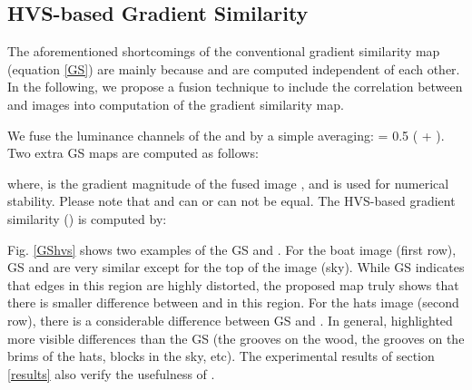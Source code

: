 \subsection{HVS-based Gradient Similarity} 

The aforementioned shortcomings of the conventional gradient similarity map (equation \ref{GS}) are mainly because  and  are computed independent of each other. In the following, we propose a fusion technique to include the correlation between  and  images into computation of the gradient similarity map.   

We fuse the luminance  channels of the  and  by a simple averaging:  = 0.5  ( + ). Two extra GS maps are computed as follows: 
                    
                    
where,  is the gradient magnitude of the fused image , and  is used for numerical stability. Please note that  and  can or can not be equal. The HVS-based gradient similarity () is computed by:
     

Fig. \ref{GShvs} shows two examples of the GS and . For the boat image (first row), GS and  are very similar except for the top of the image (sky). While GS indicates that edges in this region are highly distorted, the proposed map  truly shows that there is smaller difference between  and  in this region. For the hats image (second row), there is a considerable difference between GS and . In general,  highlighted more visible differences than the GS (the grooves on the wood, the grooves on the brims of the hats, blocks in the sky, etc). The experimental results of section \ref{results} also verify the usefulness of .              


